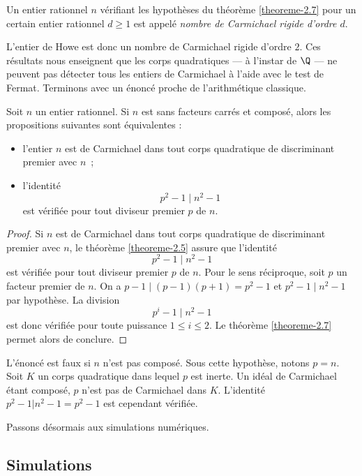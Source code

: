 \begin{definition}
	Un entier rationnel $n$ vérifiant les hypothèses du théorème \ref{theoreme-2.7} pour un certain entier rationnel $d\geq 1$ est appelé \emph{nombre de Carmichael rigide d'ordre $d$}.
\end{definition}

L'entier de Howe est donc un nombre de Carmichael rigide d'ordre $2$. Ces résultats nous enseignent que les corps quadratiques — à l'instar de $\Q$ — ne peuvent pas détecter tous les entiers de Carmichael à l'aide avec le test de Fermat. Terminons avec un énoncé proche de l'arithmétique classique.

\begin{corollaire}
	Soit $n$ un entier rationnel. Si $n$ est sans facteurs carrés et composé, alors les propositions suivantes sont équivalentes :
	\begin{itemize}
		\item l'entier $n$ est de Carmichael dans tout corps quadratique de discriminant premier avec $n$~;
		\item l'identité \[p^2 - 1 \mid n^2 - 1\] est vérifiée pour tout diviseur premier $p$ de $n$.
	\end{itemize}
\end{corollaire}

\begin{proof}
	Si $n$ est de Carmichael dans tout corps quadratique de discriminant premier avec $n$, le théorème \ref{theoreme-2.5} assure que l'identité \[p^2 - 1 \mid n^2 - 1\] est vérifiée pour tout diviseur premier $p$ de $n$. Pour le sens réciproque, soit $p$ un facteur premier de $n$. On a $p-1\mid (p-1)(p+1) = p^2 - 1$ et $p^2 - 1 \mid n^2 - 1$ par hypothèse. La division \[p^i - 1 \mid n^2 - 1\] est donc vérifiée pour toute puissance $1\leq i \leq 2$. Le théorème \ref{theoreme-2.7} permet alors de conclure.
\end{proof}

\begin{remarque}
	L'énoncé est faux si $n$ n'est pas composé. Sous cette hypothèse, notons $p=n$. Soit $K$ un corps quadratique dans lequel $p$ est inerte. Un idéal de Carmichael étant composé, $p$ n'est pas de Carmichael dans $K$. L'identité $p^2 - 1 | n^2 - 1 = p^2 - 1$ est cependant vérifiée.
\end{remarque}

Passons désormais aux simulations numériques.

\subsection{Simulations}

